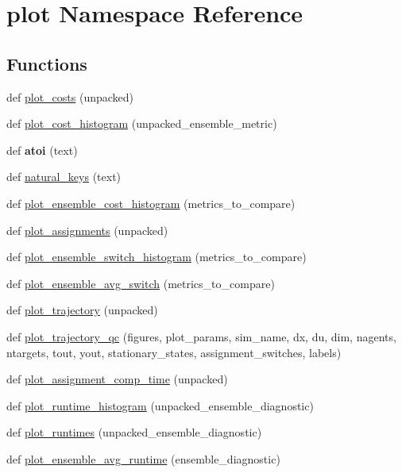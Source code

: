 \hypertarget{namespaceplot}{}\section{plot Namespace Reference}
\label{namespaceplot}
\subsection*{Functions}
\begin{DoxyCompactItemize}
\item 
def \mbox{\hyperlink{namespaceplot_a5f23bc00f5f8588e6c3de940ff5a0b28}{plot\+\_\+costs}} (unpacked)
\item 
def \mbox{\hyperlink{namespaceplot_a68b5e0433f49ae13ceb7df2cc74b9911}{plot\+\_\+cost\+\_\+histogram}} (unpacked\+\_\+ensemble\+\_\+metric)
\item 
\mbox{\label{namespaceplot_ade09616888bd2e0c6243d4f2b058c56d}} 
def {\bfseries atoi} (text)
\item 
def \mbox{\hyperlink{namespaceplot_a4f94bf2cfe8afc4ea063feb3df961780}{natural\+\_\+keys}} (text)
\item 
def \mbox{\hyperlink{namespaceplot_ac2c45ae26abb51de90367c1c70e32ff2}{plot\+\_\+ensemble\+\_\+cost\+\_\+histogram}} (metrics\+\_\+to\+\_\+compare)
\item 
def \mbox{\hyperlink{namespaceplot_adbe4a880d658eef510387e828d07beb7}{plot\+\_\+assignments}} (unpacked)
\item 
def \mbox{\hyperlink{namespaceplot_a12a2f66559fa523476ed631c3eb7e30e}{plot\+\_\+ensemble\+\_\+switch\+\_\+histogram}} (metrics\+\_\+to\+\_\+compare)
\item 
def \mbox{\hyperlink{namespaceplot_a27a576db25c863b2ab7d69cf99fe752a}{plot\+\_\+ensemble\+\_\+avg\+\_\+switch}} (metrics\+\_\+to\+\_\+compare)
\item 
def \mbox{\hyperlink{namespaceplot_ac25b7a327efbae3be2f6112eb8d73f6e}{plot\+\_\+trajectory}} (unpacked)
\item 
def \mbox{\hyperlink{namespaceplot_aa7cee01861bd94b58f7cd046176da3f9}{plot\+\_\+trajectory\+\_\+qc}} (figures, plot\+\_\+params, sim\+\_\+name, dx, du, dim, nagents, ntargets, tout, yout, stationary\+\_\+states, assignment\+\_\+switches, labels)
\item 
def \mbox{\hyperlink{namespaceplot_a4aaddd2ee72a3518cb543c50095c6489}{plot\+\_\+assignment\+\_\+comp\+\_\+time}} (unpacked)
\item 
def \mbox{\hyperlink{namespaceplot_a9d05c6f2e6eef461ec8c439e75431cef}{plot\+\_\+runtime\+\_\+histogram}} (unpacked\+\_\+ensemble\+\_\+diagnostic)
\item 
def \mbox{\hyperlink{namespaceplot_ac876087b1280d54a7321c131b94a51b4}{plot\+\_\+runtimes}} (unpacked\+\_\+ensemble\+\_\+diagnostic)
\item 
def \mbox{\hyperlink{namespaceplot_a5f49d0a04a95306f00e03a27d4c0cdf2}{plot\+\_\+ensemble\+\_\+avg\+\_\+runtime}} (ensemble\+\_\+diagnostic)
\end{DoxyCompactItemize}
